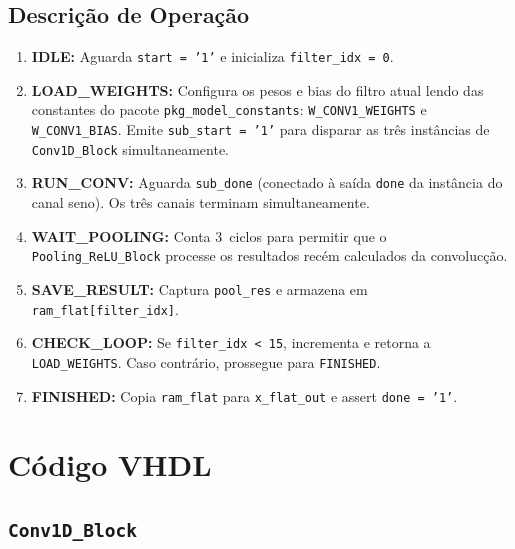 \documentclass[a4paper,12pt]{article}
\begin{document}
\subsection{Descri\c{c}\~ao de Opera\c{c}\~ao}

\begin{enumerate}
    \item \textbf{IDLE:} Aguarda \texttt{start = '1'} e inicializa \texttt{filter\_idx = 0}.
    \item \textbf{LOAD\_WEIGHTS:} Configura os pesos e bias do filtro atual lendo das constantes do pacote \texttt{pkg\_model\_constants}: \texttt{W\_CONV1\_WEIGHTS} e \texttt{W\_CONV1\_BIAS}. Emite \texttt{sub\_start = '1'} para disparar as tr\^es inst\^ancias de \texttt{Conv1D\_Block} simultaneamente.
    \item \textbf{RUN\_CONV:} Aguarda \texttt{sub\_done} (conectado \`a sa\'ida \texttt{done} da inst\^ancia do canal seno). Os tr\^es canais terminam simultaneamente.
    \item \textbf{WAIT\_POOLING:} Conta 3~ciclos para permitir que o \texttt{Pooling\_ReLU\_Block} processe os resultados rec\'em calculados da convoluc\c{c}\~ao.
    \item \textbf{SAVE\_RESULT:} Captura \texttt{pool\_res} e armazena em \texttt{ram\_flat[filter\_idx]}.
    \item \textbf{CHECK\_LOOP:} Se \texttt{filter\_idx < 15}, incrementa e retorna a \texttt{LOAD\_WEIGHTS}. Caso contr\'ario, prossegue para \texttt{FINISHED}.
    \item \textbf{FINISHED:} Copia \texttt{ram\_flat} para \texttt{x\_flat\_out} e assert \texttt{done = '1'}.
\end{enumerate}


\section{C\'odigo VHDL}

\subsection{\texttt{Conv1D\_Block}}
\end{document}
